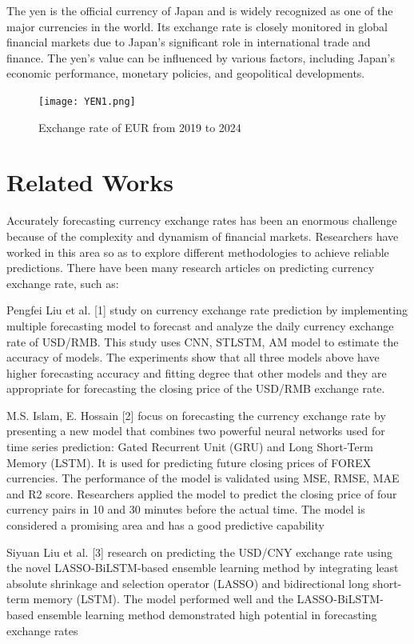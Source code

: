 \documentclass{ieeeojies}
\begin{document}
The yen is the official currency of Japan and is widely recognized as one of the major currencies in the world. Its exchange rate is closely monitored in global financial markets due to Japan's significant role in international trade and finance. The yen's value can be influenced by various factors, including Japan's economic performance, monetary policies, and geopolitical developments.
\begin{figure}[h]
    \centering
    \texttt{[image: YEN1.png]}
    \label{fig:yen_image}
    \caption{Exchange rate of EUR from 2019 to 2024}
\end{figure}

\section{Related Works}
Accurately forecasting currency exchange rates has been an enormous challenge because of the complexity and dynamism of financial markets. Researchers have worked in this area so as to explore different methodologies to achieve reliable predictions. There have been many research articles on predicting currency exchange rate, such as:

Pengfei Liu et al. [1] study on currency exchange rate prediction by implementing multiple forecasting model to forecast and analyze the daily currency exchange rate of USD/RMB. This study uses CNN, STLSTM, AM model to estimate the accuracy of models. The experiments show that all three models above have higher forecasting accuracy and fitting degree that other models and they are appropriate for forecasting the closing price of the USD/RMB exchange rate.

M.S. Islam, E. Hossain [2] focus on forecasting the currency exchange rate by presenting a new model that combines two powerful neural networks used for time series prediction: Gated Recurrent Unit (GRU) and Long Short-Term Memory (LSTM). It is used for predicting future closing prices of FOREX currencies. The performance of the model is validated using MSE, RMSE, MAE and R2 score. Researchers applied the model to predict the closing price of four currency pairs in 10 and 30 minutes before the actual time. The model is considered a promising area and has a good predictive capability

Siyuan Liu et al. [3] research on predicting the USD/CNY exchange rate using the novel LASSO-BiLSTM-based ensemble learning method by integrating least absolute shrinkage and selection operator (LASSO) and bidirectional long short-term memory (LSTM). The model performed well and the LASSO-BiLSTM-based ensemble learning method demonstrated high potential in forecasting exchange rates
\end{document}
